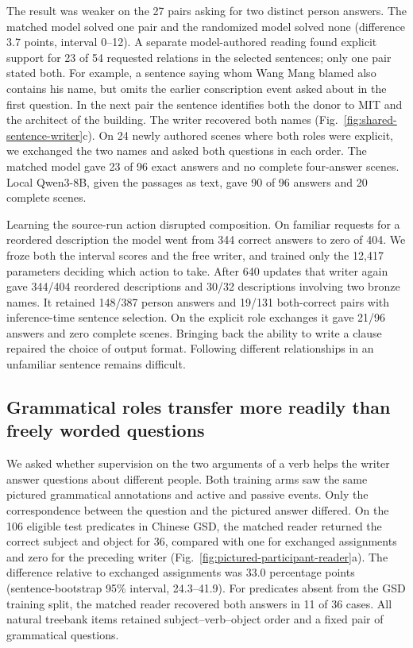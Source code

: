 \documentclass[12pt,a4paper]{article}
\providecommand{\DIFadd}[1]{{\protect\color{blue} \sf #1}} %
\begin{document}
\DIFadd{The result was weaker on the 27 pairs asking for two distinct person answers. The matched model solved one pair and the randomized model solved none (difference 3.7 points, interval 0--12). A separate model-authored reading found explicit support for 23 of 54 requested relations in the selected sentences; only one pair stated both. For example, a sentence saying whom Wang Mang blamed also contains his name, but omits the earlier conscription event asked about in the first question. In the next pair the sentence identifies both the donor to MIT and the architect of the building. The writer recovered both names (Fig.~\ref{fig:shared-sentence-writer}c). On 24 newly authored scenes where both roles were explicit, we exchanged the two names and asked both questions in each order. The matched model gave 23 of 96 exact answers and no complete four-answer scenes. Local Qwen3-8B, given the passages as text, gave 90 of 96 answers and 20 complete scenes.
}

\DIFadd{Learning the source-run action disrupted composition. On familiar requests for a reordered description the model went from 344 correct answers to zero of 404. We froze both the interval scores and the free writer, and trained only the 12,417 parameters deciding which action to take. After 640 updates that writer again gave 344/404 reordered descriptions and 30/32 descriptions involving two bronze names. It retained 148/387 person answers and 19/131 both-correct pairs with inference-time sentence selection. On the explicit role exchanges it gave 21/96 answers and zero complete scenes. Bringing back the ability to write a clause repaired the choice of output format. Following different relationships in an unfamiliar sentence remains difficult.
}

\subsection*{\DIFadd{Grammatical roles transfer more readily than freely worded questions}}
\DIFadd{We asked whether supervision on the two arguments of a verb helps the writer answer questions about different people. Both training arms saw the same pictured grammatical annotations and active and passive events. Only the correspondence between the question and the pictured answer differed. On the 106 eligible test predicates in Chinese GSD, the matched reader returned the correct subject and object for 36, compared with one for exchanged assignments and zero for the preceding writer (Fig.~\ref{fig:pictured-participant-reader}a). The difference relative to exchanged assignments was 33.0 percentage points (sentence-bootstrap 95\% interval, 24.3--41.9). For predicates absent from the GSD training split, the matched reader recovered both answers in 11 of 36 cases. All natural treebank items retained subject--verb--object order and a fixed pair of grammatical questions.
}
\end{document}
